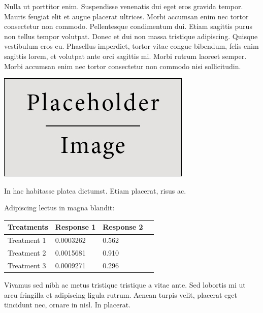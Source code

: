 \documentclass[a0,landscape]{a0poster}
\begin{document}
\begin{multicols}{4}
Nulla ut porttitor enim. Suspendisse venenatis dui eget eros gravida tempor. Mauris feugiat elit et augue placerat ultrices. Morbi accumsan enim nec tortor consectetur non commodo. Pellentesque condimentum dui. Etiam sagittis purus non tellus tempor volutpat. Donec et dui non massa tristique adipiscing. Quisque vestibulum eros eu. Phasellus imperdiet, tortor vitae congue bibendum, felis enim sagittis lorem, et volutpat ante orci sagittis mi. Morbi rutrum laoreet semper. Morbi accumsan enim nec tortor consectetur non commodo nisi sollicitudin.

\begin{center}\vspace{1cm}
\includegraphics[width=0.8\linewidth]{placeholder}
\end{center}\vspace{1cm}

In hac habitasse platea dictumst. Etiam placerat, risus ac.

Adipiscing lectus in magna blandit:

\begin{center}\vspace{1cm}
\begin{tabular}{l l l l}
\toprule
\textbf{Treatments} & \textbf{Response 1} & \textbf{Response 2} \\
\midrule
Treatment 1 & 0.0003262 & 0.562 \\
Treatment 2 & 0.0015681 & 0.910 \\
Treatment 3 & 0.0009271 & 0.296 \\
\bottomrule
\end{tabular}
\end{center}\vspace{1cm}

Vivamus sed nibh ac metus tristique tristique a vitae ante. Sed lobortis mi ut arcu fringilla et adipiscing ligula rutrum. Aenean turpis velit, placerat eget tincidunt nec, ornare in nisl. In placerat.


\end{multicols}
\end{document}
